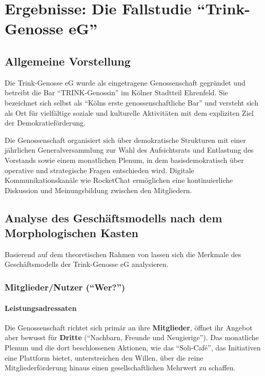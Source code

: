 \section{Ergebnisse: Die Fallstudie \enquote{Trink-Genosse eG}}

\subsection{Allgemeine Vorstellung}

Die Trink-Genosse eG wurde als eingetragene Genossenschaft gegründet und betreibt die Bar \enquote{TRINK-Genossin} im Kölner Stadtteil Ehrenfeld. Sie bezeichnet sich selbst als \enquote{Kölns erste genossenschaftliche Bar} und versteht sich als Ort für vielfältige soziale und kulturelle Aktivitäten mit dem expliziten Ziel der Demokratieförderung.

Die Genossenschaft organisiert sich über demokratische Strukturen mit einer jährlichen Generalversammlung zur Wahl des Aufsichtsrats und Entlastung des Vorstands sowie einem monatlichen Plenum, in dem basisdemokratisch über operative und strategische Fragen entschieden wird. Digitale Kommunikationskanäle wie RocketChat ermöglichen eine kontinuierliche Diskussion und Meinungsbildung zwischen den Mitgliedern.

\subsection{Analyse des Geschäftsmodells nach dem Morphologischen Kasten}

Basierend auf dem theoretischen Rahmen von \textcite{blome-dreesGenossenschaftlicheGeschaeftsmodelleSemantik2023} lassen sich die Merkmale des Geschäftsmodells der Trink-Genosse eG analysieren.



\subsubsection{Mitglieder/Nutzer (\enquote{Wer?})}

\paragraph{Leistungsadressaten}
Die Genossenschaft richtet sich primär an ihre \textbf{Mitglieder}, öffnet ihr Angebot aber bewusst für \textbf{Dritte} (\enquote{Nachbarn, Freunde und Neugierige}). Das monatliche Plenum und die dort beschlossenen Aktionen, wie das \enquote{Soli-Café}, das Initiativen eine Plattform bietet, unterstreichen den Willen, über die reine Mitgliederförderung hinaus einen gesellschaftlichen Mehrwert zu schaffen.

